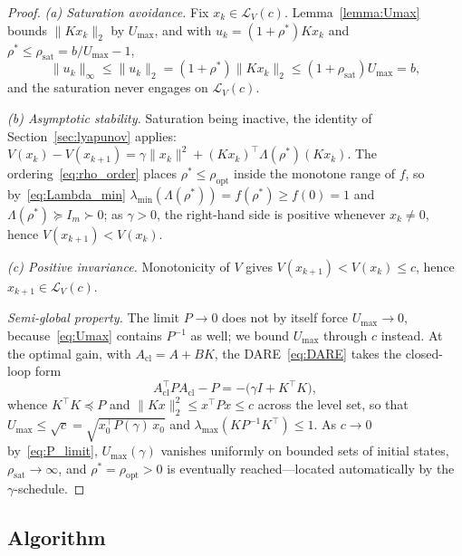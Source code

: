 \documentclass[final,5p,times,authoryear]{elsarticle}
\theoremstyle{plain}
\theoremstyle{definition}
\theoremstyle{remark}
\begin{document}
\begin{proof}
\emph{(a) Saturation avoidance.}  Fix $x_k \in \mathcal{L}_V(c)$.
Lemma~\ref{lemma:Umax} bounds $\|Kx_k\|_2$ by $U_{\max}$, and with
$u_k = (1+\rho^*)Kx_k$ and $\rho^* \leq \rho_{\mathrm{sat}} =
b/U_{\max}-1$,
\begin{equation}
\|u_k\|_\infty \leq \|u_k\|_2 = (1+\rho^*)\|Kx_k\|_2
   \leq (1+\rho_{\mathrm{sat}})U_{\max} = b,
\end{equation}
and the saturation never engages on $\mathcal{L}_V(c)$.

\emph{(b) Asymptotic stability.}  Saturation being inactive, the
identity of Section~\ref{sec:lyapunov} applies:
$V(x_k) - V(x_{k+1}) =
\gamma\|x_k\|^2 + (Kx_k)^\top\Lambda(\rho^*)(Kx_k)$.  The
ordering~\eqref{eq:rho_order} places $\rho^* \leq \rho_{\mathrm{opt}}$
inside the monotone range of $f$, so by~\eqref{eq:Lambda_min}
$\lambda_{\min}(\Lambda(\rho^*)) = f(\rho^*) \geq f(0) = 1$ and
$\Lambda(\rho^*) \succeq I_m \succ 0$; as $\gamma > 0$, the right-hand
side is positive whenever $x_k \neq 0$, hence
$V(x_{k+1}) < V(x_k)$.

\emph{(c) Positive invariance.}  Monotonicity of $V$ gives
$V(x_{k+1}) < V(x_k) \leq c$, hence $x_{k+1} \in \mathcal{L}_V(c)$.

\emph{Semi-global property.}  The limit $P \to 0$ does not by itself
force $U_{\max} \to 0$, because~\eqref{eq:Umax} contains $P^{-1}$ as
well; we bound $U_{\max}$ through $c$ instead.  At the optimal gain,
with $A_{\mathrm{cl}} = A + BK$, the DARE~\eqref{eq:DARE} takes the
closed-loop form
\begin{equation}
A_{\mathrm{cl}}^\top P A_{\mathrm{cl}} - P
   = -\bigl(\gamma I + K^\top\! K\bigr),
\label{eq:cl_lyap}
\end{equation}
whence $K^\top\! K \preceq P$ and
$\|Kx\|_2^2 \leq x^\top\! Px \leq c$ across the level set, so that
$U_{\max} \leq \sqrt{c} = \sqrt{x_0^\top P(\gamma)\,x_0}$ and
$\lambda_{\max}(KP^{-1}K^\top) \leq 1$.  As $c \to 0$
by~\eqref{eq:P_limit}, $U_{\max}(\gamma)$ vanishes uniformly on
bounded sets of initial states, $\rho_{\mathrm{sat}} \to \infty$, and
$\rho^* = \rho_{\mathrm{opt}} > 0$ is eventually reached---located
automatically by the $\gamma$-schedule.
\end{proof}

\subsection{Algorithm}\label{sec:algorithm}
\end{document}
